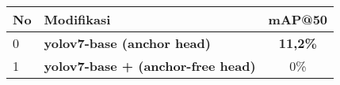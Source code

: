 \begin{table}[H]
  \centering
  \label{tbl:anchorfree_perf}
  \vspace{-1ex}
  \begin{tabular}{ l l c }
    \toprule[1.5pt]
    No & Modifikasi                                 &mAP@50 \\
    \midrule
    0  & \textbf{yolov7-base (anchor head)}                       & \textbf{11,2\%}\\
    1  & \textbf{yolov7-base + (anchor-free head)}       & 0\%\\
    \bottomrule[1.5pt]
  \end{tabular}
\end{table}